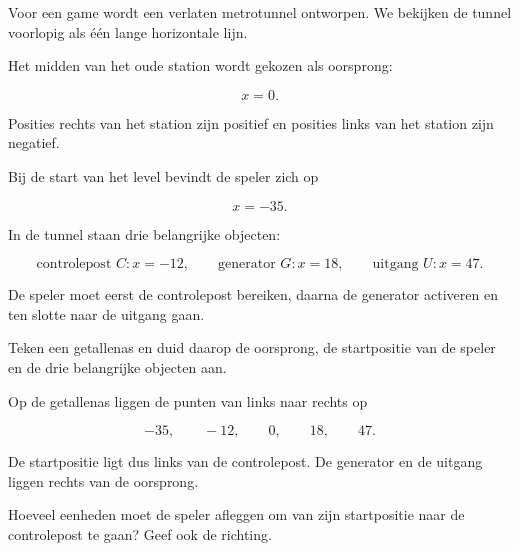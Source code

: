 \documentclass{ximera}
\begin{document}
    \begin{oefening}[De metrotunnel]{\oefG\ESS}

        Voor een game wordt een verlaten metrotunnel ontworpen.
        We bekijken de tunnel voorlopig als één lange horizontale lijn.
        
        Het midden van het oude station wordt gekozen als oorsprong:
        
        \[
        x=0.
        \]
        
        Posities rechts van het station zijn positief en posities links van het
        station zijn negatief.
        
        Bij de start van het level bevindt de speler zich op
        
        \[
        x=-35.
        \]
        
        In de tunnel staan drie belangrijke objecten:
        
        \[
        \text{controlepost } C: x=-12,
        \qquad
        \text{generator } G: x=18,
        \qquad
        \text{uitgang } U: x=47.
        \]
        
        De speler moet eerst de controlepost bereiken, daarna de generator
        activeren en ten slotte naar de uitgang gaan.
        
        
        \begin{question}
        
        Teken een getallenas en duid daarop de oorsprong, de startpositie van de
        speler en de drie belangrijke objecten aan.
        
        \begin{oplossing}
        
        Op de getallenas liggen de punten van links naar rechts op
        
        \[
        -35,\qquad -12,\qquad 0,\qquad 18,\qquad 47.
        \]
        
        De startpositie ligt dus links van de controlepost. De generator en de
        uitgang liggen rechts van de oorsprong.
        
        \end{oplossing}
        
        \end{question}
        
        
        \begin{question}
        
        Hoeveel eenheden moet de speler afleggen om van zijn startpositie naar de
        controlepost te gaan? Geef ook de richting.
        

\end{question}
\end{oefening}
\end{document}

